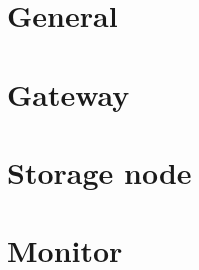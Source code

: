 \section{General}

\section{Gateway} \label{sec:gateway}

\section{Storage node} \label{sec:storage}

\section{Monitor} \label{sec:monitor}
